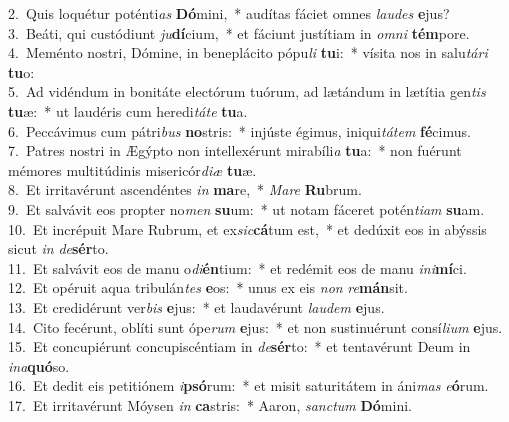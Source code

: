 {2.~}Quis loquétur poténti\textit{as} \textbf{Dó}mini,~* audítas fáciet omnes \textit{lau}\textit{des} \textbf{e}jus?\\
{3.~}Beáti, qui custódiunt \textit{ju}\textbf{dí}cium,~* et fáciunt justítiam in \textit{om}\textit{ni} \textbf{tém}pore.\\
{4.~}Meménto nostri, Dómine, in beneplácito pópu\textit{li} \textbf{tu}i:~* vísita nos in salu\textit{tá}\textit{ri} \textbf{tu}o:\\
{5.~}Ad vidéndum in bonitáte electórum tuórum, ad lætándum in lætítia gen\textit{tis} \textbf{tu}æ:~* ut laudéris cum heredi\textit{tá}\textit{te} \textbf{tu}a.\\
{6.~}Peccávimus cum pátri\textit{bus} \textbf{no}stris:~* injúste égimus, iniqui\textit{tá}\textit{tem} \textbf{fé}cimus.\\
{7.~}Patres nostri in Ægýpto non intellexérunt mirabíli\textit{a} \textbf{tu}a:~* non fuérunt mémores multitúdinis misericór\textit{di}\textit{æ} \textbf{tu}æ.\\
{8.~}Et irritavérunt ascendéntes \textit{in} \textbf{ma}re,~* \textit{Ma}\textit{re} \textbf{Ru}brum.\\
{9.~}Et salvávit eos propter no\textit{men} \textbf{su}um:~* ut notam fáceret potén\textit{ti}\textit{am} \textbf{su}am.\\
{10.~}Et incrépuit Mare Rubrum, et ex\textit{sic}\textbf{cá}tum est,~* et dedúxit eos in abýssis sicut \textit{in} \textit{de}\textbf{sér}to.\\
{11.~}Et salvávit eos de manu o\textit{di}\textbf{én}tium:~* et redémit eos de manu \textit{i}\textit{ni}\textbf{mí}ci.\\
{12.~}Et opéruit aqua tribulán\textit{tes} \textbf{e}os:~* unus ex eis \textit{non} \textit{re}\textbf{mán}sit.\\
{13.~}Et credidérunt ver\textit{bis} \textbf{e}jus:~* et laudavérunt \textit{lau}\textit{dem} \textbf{e}jus.\\
{14.~}Cito fecérunt, oblíti sunt ópe\textit{rum} \textbf{e}jus:~* et non sustinuérunt consí\textit{li}\textit{um} \textbf{e}jus.\\
{15.~}Et concupiérunt concupiscéntiam in \textit{de}\textbf{sér}to:~* et tentavérunt Deum in \textit{i}\textit{na}\textbf{quó}so.\\
{16.~}Et dedit eis petitiónem \textit{i}\textbf{psó}rum:~* et misit saturitátem in áni\textit{mas} \textit{e}\textbf{ó}rum.\\
{17.~}Et irritavérunt Móysen \textit{in} \textbf{ca}stris:~* Aaron, \textit{san}\textit{ctum} \textbf{Dó}mini.\\
